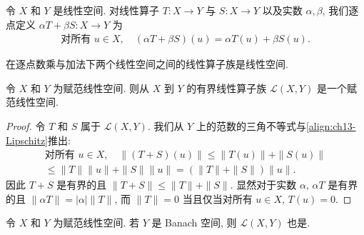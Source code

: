 \documentclass[../../main.tex]{subfiles}
\begin{document}
\begin{definition}\label{definition:ch13-算子线性组合}
令 $X$ 和 $Y$ 是线性空间. 对线性算子 $T:X\to Y$ 与 $S:X\to Y$ 以及实数 $\alpha,\beta$, 我们逐点定义 $\alpha T+\beta S:X\to Y$ 为
\begin{align}
\text{对所有 }u\in X,\quad(\alpha T+\beta S)(u)=\alpha T(u)+\beta S(u).\label{align:ch13-算子组合}
\end{align}
\end{definition}

在逐点数乘与加法下两个线性空间之间的线性算子族是线性空间.

\begin{proposition}\label{proposition:ch13-算子空间赋范}
令 $X$ 和 $Y$ 为赋范线性空间. 则从 $X$ 到 $Y$ 的有界线性算子族 $\mathcal{L}(X,Y)$ 是一个赋范线性空间.
\end{proposition}

\begin{proof}
令 $T$ 和 $S$ 属于 $\mathcal{L}(X,Y)$. 我们从 $Y$ 上的范数的三角不等式与\eqref{align:ch13-Lipschitz}推出:
\begin{align*}
\text{对所有 }u\in X,\quad\|(T+S)(u)\|\leqslant\|T(u)\|+\|S(u)\|\\
\leqslant\|T\|\|u\|+\|S\|\|u\|=(\|T\|+\|S\|)\|u\|.
\end{align*}
因此 $T+S$ 是有界的且 $\|T+S\|\leqslant\|T\|+\|S\|$. 显然对于实数 $\alpha$, $\alpha T$ 是有界的且 $\|\alpha T\|=|\alpha|\|T\|$, 而 $\|T\|=0$ 当且仅当对所有 $u\in X$, $T(u)=0$.
\end{proof}

\begin{theorem}\label{theorem:ch13-算子空间完备}
令 $X$ 和 $Y$ 为赋范线性空间. 若 $Y$ 是 Banach 空间, 则 $\mathcal{L}(X,Y)$ 也是.
\end{theorem}
\end{document}
